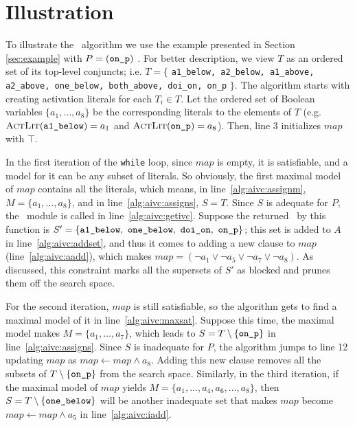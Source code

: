 \section{Illustration}
\label{sec:illust}
To illustrate the \aivcalg ~algorithm we use the example presented in Section \ref{sec:example} with $P = ({\small \texttt{on\_p}})$ .
For better description, we view $T$ as an ordered set of its top-level conjuncts; i.e. $T = \{$ {\small \texttt{a1\_below, a2\_below, a1\_above, a2\_above, one\_below, both\_above, doi\_on, on\_p}} $\}$.
The algorithm starts with creating activation literals for each $T_i \in T$. Let the ordered set of Boolean variables $\{ a_1, \ldots , a_8 \}$ be the corresponding literals to the elements of $T$ (e.g. $\actlit ({ \small \texttt{a1\_below}}) = a_1$ and $\actlit ({\small \texttt{on\_p}}) = a_8$). Then, line 3 initializes $map$ with $\top$.

In the first iteration of the \texttt{while} loop, since $map$ is
empty, it is satisfiable, and a model for it can be any subset of
literals. So obviously, the first maximal model of $map$ contains all
the literals, which means, in line~\ref{alg:aivc:assignm}, $M = \{a_1,
\ldots, a_8\}$, and in line~\ref{alg:aivc:assigns}, $S = T$. Since $S$
is adequate for $P$, the \getivc ~module is called in
line~\ref{alg:aivc:getivc}. Suppose the returned \mivc\ by this function
is $S' = \{ { \small \texttt{a1\_below},~\texttt{one\_below},
  ~\texttt{doi\_on},~\texttt{on\_p}}\}$; this set is added to $A$ in
line~\ref{alg:aivc:addset}, and thus it comes to adding a new clause
to $map$ (line~\ref{alg:aivc:aadd}), which makes $map = (\neg a_1 \vee
\neg a_5 \vee \neg a_7 \vee \neg a_8)$. As discussed, this constraint
marks all the supersets of $S'$ as blocked and prunes them off the
search space.

For the second iteration, $map$ is still satisfiable,
so the algorithm gets to find a maximal model of it in line~\ref{alg:aivc:maxsat}. Suppose this time, the maximal model makes $M = \{a_1, \ldots, a_7\}$,
which leads to $S = T \setminus \{ {\small \texttt{on\_p}}\} $ in line~\ref{alg:aivc:assigns}.
Since $S$ is inadequate for $P$,
the algorithm jumps to line 12 updating
$map$ as $map \leftarrow map \wedge a_8$.
Adding this new clause removes all the subsets of
$T \setminus \{{\small \texttt{on\_p}}\}$
from the search space. Similarly, in the third iteration, if the maximal model of $map$
yields $M = \{a_1, \ldots, a_4, a_6, \ldots, a_8\}$, then $S = T \setminus \{ {\small \texttt{one\_below}}\} $ will be another inadequate set that makes $map$ become
$map \leftarrow map \wedge a_5$
in line~\ref{alg:aivc:iadd}.

